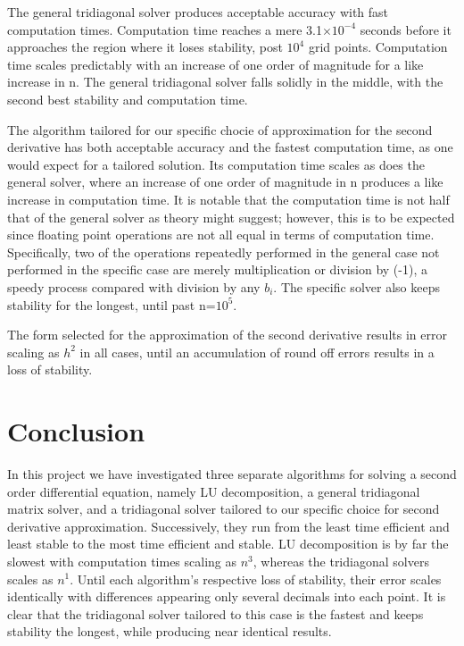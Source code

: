 \documentclass[11pt,a4paper]{article}
\begin{document}
The general tridiagonal solver produces acceptable accuracy with fast computation times. Computation time reaches a mere 3.1$\times10^{-4}$ seconds before it approaches the region where it loses stability, post $10^4$ grid points. Computation time scales predictably with an increase of one order of magnitude for a like increase in n. The general tridiagonal solver falls solidly in the middle, with the second best stability and computation time.

The algorithm tailored for our specific chocie of approximation for the second derivative has both acceptable accuracy and the fastest computation time, as one would expect for a tailored solution. Its computation time scales as does the general solver, where an increase of one order of magnitude in n produces a like increase in computation time. It is notable that the computation time is not half that of the general solver as theory might suggest; however, this is to be expected since floating point operations are not all equal in terms of computation time. Specifically, two of the operations repeatedly performed in the general case not performed in the specific case are merely multiplication or division by (-1), a speedy process compared with division by any $b_i$. The specific solver also keeps stability for the longest, until past n=$10^5$.

The form selected for the approximation of the second derivative results in error scaling as $h^2$ in all cases, until an accumulation of round off errors results in a loss of stability.

\section{Conclusion}

In this project we have investigated three separate algorithms for solving a second order differential equation, namely LU decomposition, a general tridiagonal matrix solver, and a tridiagonal solver tailored to our specific choice for second derivative approximation. Successively, they run from the least time efficient and least stable to the most time efficient and stable. LU decomposition is by far the slowest with computation times scaling as $n^3$, whereas the tridiagonal solvers scales as $n^1$. Until each algorithm's respective loss of stability, their error scales identically with differences appearing only several decimals into each point. It is clear that the tridiagonal solver tailored to this case is the fastest and keeps stability the longest, while producing near identical results. 
\end{document}
